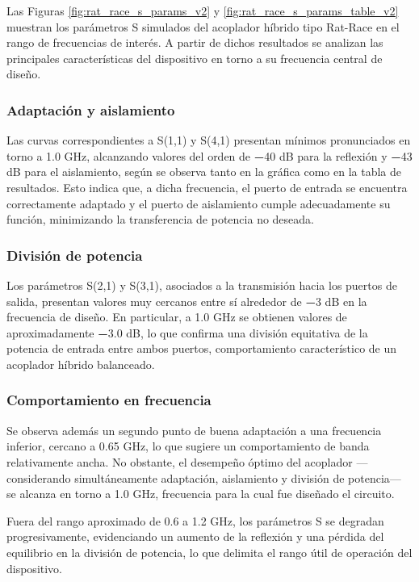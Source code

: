 Las Figuras \ref{fig:rat_race_s_params_v2} y \ref{fig:rat_race_s_params_table_v2} muestran los parámetros S simulados del acoplador híbrido tipo Rat-Race en el rango de frecuencias de interés. A partir de dichos resultados se analizan las principales características del dispositivo en torno a su frecuencia central de diseño. 

\subsubsection{Adaptación y aislamiento}

Las curvas correspondientes a S(1,1) y S(4,1) presentan mínimos pronunciados en torno a 1.0 GHz, alcanzando valores del orden de \textbf{−}40 dB para la reflexión y \textbf{−}43 dB para el aislamiento, según se observa tanto en la gráfica como en la tabla de resultados. Esto indica que, a dicha frecuencia, el puerto de entrada se encuentra correctamente adaptado y el puerto de aislamiento cumple adecuadamente su función, minimizando la transferencia de potencia no deseada. 

\subsubsection{División de potencia }

Los parámetros S(2,1) y S(3,1), asociados a la transmisión hacia los puertos de salida, presentan valores muy cercanos entre sí alrededor de \textbf{−}3 dB en la frecuencia de diseño. En particular, a 1.0 GHz se obtienen valores de aproximadamente \textbf{−}3.0 dB, lo que confirma una división equitativa de la potencia de entrada entre ambos puertos, comportamiento característico de un acoplador híbrido balanceado. 

\subsubsection{Comportamiento en frecuencia }

Se observa además un segundo punto de buena adaptación a una frecuencia inferior, cercano a 0.65 GHz, lo que sugiere un comportamiento de banda relativamente ancha. No obstante, el desempeño óptimo del acoplador —considerando simultáneamente adaptación, aislamiento y división de potencia— se alcanza en torno a 1.0 GHz, frecuencia para la cual fue diseñado el circuito.

Fuera del rango aproximado de 0.6 a 1.2 GHz, los parámetros S se degradan progresivamente, evidenciando un aumento de la reflexión y una pérdida del equilibrio en la división de potencia, lo que delimita el rango útil de operación del dispositivo.

